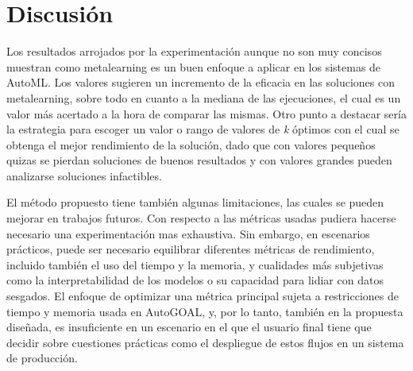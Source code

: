 \section{Discusión}\label{sec:disc}

Los resultados arrojados por la experimentación aunque no son muy concisos
muestran como metalearning es un buen enfoque a aplicar en los sistemas de
AutoML. Los valores sugieren un incremento de la eficacia en las soluciones
con metalearning, sobre todo en cuanto a la mediana de las ejecuciones, el
cual es un valor más acertado a la hora de comparar las mismas. Otro punto a
destacar sería la estrategia para escoger un valor o rango de valores de
\emph{k} óptimos con el cual se obtenga el mejor rendimiento de la solución,
dado que con valores pequeños quizas se pierdan soluciones de buenos
resultados y con valores grandes pueden analizarse soluciones infactibles.

El método propuesto tiene también algunas limitaciones, las cuales se pueden
mejorar en trabajos futuros. Con respecto a las métricas usadas pudiera
hacerse necesario una experimentación mas exhaustiva. Sin embargo, en
escenarios prácticos, puede ser necesario equilibrar diferentes métricas de
rendimiento, incluido también el uso del tiempo y la memoria, y cualidades más
subjetivas como la interpretabilidad de los modelos o su capacidad para lidiar
con datos sesgados. El enfoque de optimizar una métrica principal sujeta a
restricciones de tiempo y memoria usada en AutoGOAL, y, por lo tanto, también
en la propuesta diseñada, es insuficiente en un escenario en el que el usuario
final tiene que decidir sobre cuestiones prácticas como el despliegue de estos
flujos en un sistema de producción.

